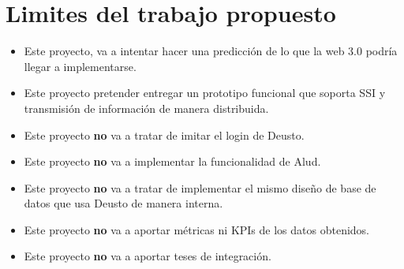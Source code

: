 \section{Limites del trabajo propuesto}
\begin{itemize}
    \item Este proyecto, va a intentar hacer una predicción de lo que la web 3.0 podría llegar a implementarse.
    \item Este proyecto pretender entregar un prototipo funcional que soporta SSI y transmisión de información de manera distribuida.
    \item Este proyecto \textbf{no} va a tratar de imitar el login de Deusto.
    \item Este proyecto \textbf{no} va a implementar la funcionalidad de Alud. 
    \item Este proyecto \textbf{no} va a tratar de implementar el mismo diseño de base de datos que usa Deusto de manera interna.
    \item Este proyecto \textbf{no} va a aportar métricas ni KPIs de los datos obtenidos.
    \item Este proyecto \textbf{no} va a aportar teses de integración.
\end{itemize}

\newpage
\thispagestyle{empty}